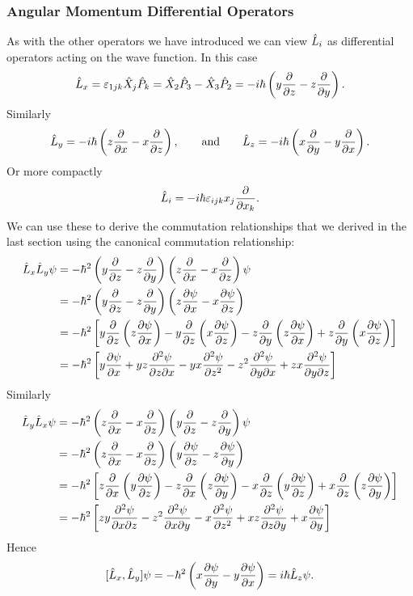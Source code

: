\subsubsection{Angular Momentum Differential Operators}
As with the other operators we have introduced we can view \(\hat{L}_i\) as differential operators acting on the wave function.
In this case
\[\hat{L}_x = \varepsilon_{1jk}\hat{X}_j\hat{P}_k = \hat{X}_2\hat{P}_3 - \hat{X}_3\hat{P}_2 = -i\hbar\left(y\pdv{z} - z\pdv{y}\right).\]
Similarly
\[\hat{L}_y = -i\hbar\left(z\pdv{x} - x\pdv{z}\right), \qquad\text{and}\qquad \hat{L}_z = -i\hbar\left(x\pdv{y} - y\pdv{x}\right).\]
Or more compactly
\[\hat{L}_i = -i\hbar\varepsilon_{ijk}x_j\pdv{x_k}.\]
We can use these to derive the commutation relationships that we derived in the last section using the canonical commutation relationship:
\begin{align*}
    \hat{L}_x\hat{L}_y\psi &= -\hbar^2\left(y\pdv{z} - z\pdv{y}\right)\left(z\pdv{x} - x\pdv{z}\right)\psi\\
    &= -\hbar^2\left(y\pdv{z} - z\pdv{y}\right) \left(z\pdv{\psi}{x} - x\pdv{\psi}{z}\right)\\
    &= -\hbar^2\left[y\pdv{z}\left(z\pdv{\psi}{x}\right) - y\pdv{z}\left(x\pdv{\psi}{z}\right) - z\pdv{y}\left(z\pdv{\psi}{x}\right) + z\pdv{y}\left(x\pdv{\psi}{z}\right)\right]\\
    &= -\hbar^2\left[y\pdv{\psi}{x} + yz\frac{\partial^2{\psi}}{\partial{z}\partial{x}} - yx\pdv[2]{\psi}{z} - z^2\frac{\partial^2{\psi}}{\partial{y}\partial{x}} + zx\pdv{\psi}{y}{z}\right]\\
\end{align*}
Similarly
\begin{align*}
    \hat{L}_y\hat{L}_x\psi &= -\hbar^2\left(z\pdv{x} - x\pdv{z}\right)\left(y\pdv{z} - z\pdv{y}\right)\psi\\
    &= -\hbar^2\left(z\pdv{x} - x\pdv{z}\right)\left(y\pdv{\psi}{z} - z\pdv{\psi}{y}\right)\\
    &= -\hbar^2\left[z\pdv{x}\left(y\pdv{\psi}{z}\right) - z\pdv{x}\left(z\pdv{\psi}{y}\right) - x\pdv{z}\left(y\pdv{\psi}{z}\right) + x\pdv{z}\left(z\pdv{\psi}{y}\right)\right]\\
    &= -\hbar^2\left[zy\frac{\partial^2{\psi}}{\partial{x}\partial{z}} - z^2\frac{\partial^2{\psi}}{\partial{x}\partial{y}} - x\pdv[2]{\psi}{z} + xz\frac{\partial^2{\psi}}{\partial{z}\partial{y}} + x\pdv{\psi}{y}\right]
\end{align*}
Hence
\[[\hat{L}_x, \hat{L}_y]\psi = -\hbar^2\left(x\pdv{\psi}{y} - y\pdv{\psi}{x}\right) = i\hbar\hat{L}_z\psi.\]

